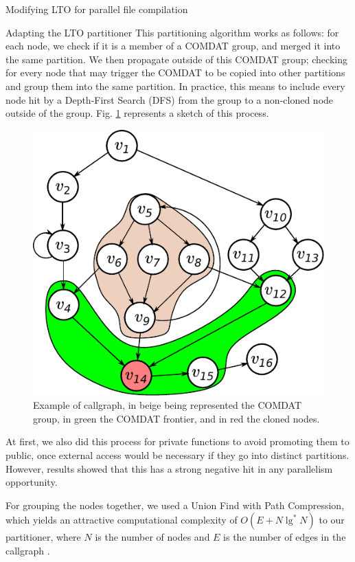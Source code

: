 \begin{section}{Modifying LTO for parallel file compilation}
\begin{subsection}{Adapting the LTO partitioner}
This partitioning algorithm works as follows: for each node, we check if it
is a member of a COMDAT \citep{comdat} group, and
merged it into the same partition. We then propagate outside of this COMDAT group;
checking for every node that may trigger the COMDAT to be copied into other
partitions and group them into the same partition. In practice,
this means to include every node hit by a Depth-First
Search (DFS) from the group to a non-cloned node outside of the group.
Fig. \ref{fig:comdat_frontier} represents a sketch of this process.

\begin{figure}
\centering
	 \includegraphics[scale=0.7]{figuras/comdat_frontier.pdf}
	  \caption{Example of callgraph, in beige being represented the COMDAT group,
	  in green the COMDAT frontier, and in red the cloned nodes.}
	  \label{fig:comdat_frontier}
\end{figure}

At first, we also did this process for private functions to avoid
promoting them to public, once external access would be necessary if they go
into distinct partitions. However, results showed that this has a strong
negative hit in any parallelism opportunity.

For grouping the nodes together,
we used a Union Find with Path Compression, which yields an attractive
computational complexity of $O(E + N \lg^*N)$ to our partitioner, where $N$ is the
number of nodes and $E$ is the number of edges in the callgraph \citep{feufiloff}.


\end{subsection}
\end{section}
